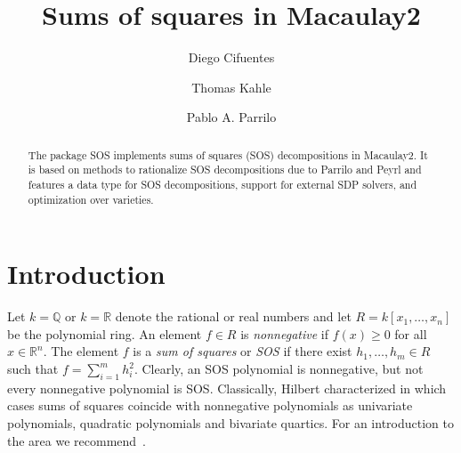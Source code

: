\documentclass[11pt]{amsart}
\theoremstyle{plain}%
\theoremstyle{definition}
\theoremstyle{remark}
\newcommand{\SOS}{\textsc{SOS}\xspace}
\newcommand{\QQ}{\mathbb{Q}}
\newcommand{\RR}{\mathbb{R}}
\begin{document}
\title[SOS.m2]{Sums of squares in Macaulay2}

\author{Diego Cifuentes}
\address{Massachusetts Institute of Technology \\ Cambridge, MA, USA}

\author{Thomas Kahle}
\address{Otto-von-Guericke University \\ Magdeburg, Germany}

\author{Pablo A. Parrilo}
\address{Massachusetts Institute of Technology \\ Cambridge, MA, USA}


\begin{abstract}
  The package \SOS implements sums of squares (SOS) decompositions in
  Macaulay2.  It is based on methods to rationalize SOS decompositions
  due to Parrilo and Peyrl and features a data type for SOS
  decompositions, support for external SDP solvers, and optimization
  over varieties.
\end{abstract}

\maketitle


\section{Introduction}
\label{s:intro}

Let $k = \QQ$ or $k = \RR$ denote the rational or real numbers and let $R = k[x_{1},\dots,x_{n}]$ be the polynomial ring.  
An element $f\in R$ is \emph{nonnegative} if $f(x) \ge 0$ for all $x \in \RR^{n}$.  
The element $f$ is a \emph{sum of squares} or \emph{SOS} if there exist $h_{1},\dots,h_{m} \in R$ such that $f=\sum_{i=1}^{m}h_{i}^{2}$.
Clearly, an SOS polynomial is nonnegative, but not every nonnegative polynomial is SOS.
Classically, Hilbert characterized in which cases sums of squares coincide with nonnegative polynomials as univariate polynomials, quadratic polynomials and bivariate quartics.  
For an introduction to the area we recommend~\cite{scheiderer2009positivity,blekherman2012semidefinite}.
\end{document}
